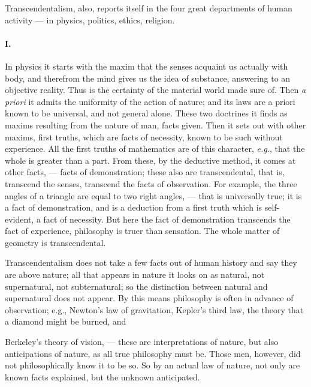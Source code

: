 \documentclass[12pt]{article}
\begin{document}

Transcendentalism, also, reports itself in the four 
great departments of human activity --- in physics, politics, ethics, religion. 

\paragraph{I.} In physics it starts with the maxim that the senses 
acquaint us actually with body, and therefrom the 
mind gives us the idea of substance, answering to an 
objective reality. Thus is the certainty of the material 
world made sure of. Then \emph{a priori} it admits the uniformity of the action of nature; and its laws are a 
priori known to be universal, and not general alone. 
These two doctrines it finds as maxims resulting from 
the nature of man, facts given. Then it sets out with 
other maxims, first truths, which are facts of necessity, 
known to be such without experience. All the first 
truths of mathematics are of this character, \emph{e.g.}, that 
the whole is greater than a part. From these, by the 
deductive method, it comes at other facts, --- facts of 
demonstration; these also are transcendental, that is, 
transcend the senses, transcend the facts of observation. For example, the three angles of a triangle are 
equal to two right angles, --- that is universally true; 
it is a fact of demonstration, and is a deduction from 
a first truth which is self-evident, a fact of necessity. 
But here the fact of demonstration transcends the fact 
of experience, philosophy is truer than sensation. The 
whole matter of geometry is transcendental. 

Transcendentalism does not take a few facts out of 
human history and say they are above nature; all that 
appears in nature it looks on as natural, not supernatural, not subternatural; so the distinction between 
natural and supernatural does not appear. By this 
means philosophy is often in advance of observation; 
e.g., Newton's law of gravitation, Kepler's third law, 
the theory that a diamond might be burned, and 




Berkeley's theory of vision, --- these are interpretations 
of nature, but also anticipations of nature, as all true 
philosophy must be. Those men, however, did not 
philosophically know it to be so. So by an actual law 
of nature, not only are known facts explained, but the 
unknown anticipated. 
\end{document}
